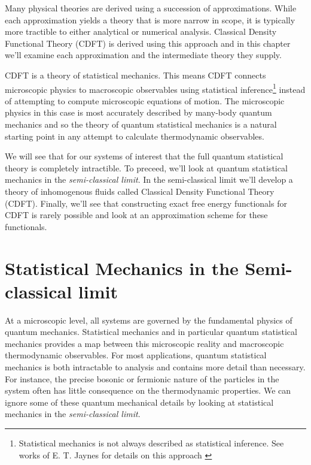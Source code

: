 \label{chapter:cdft_intro}

Many physical theories are derived using a succession of approximations. While
each approximation yields a theory that is more narrow in scope, it is
typically more tractible to either analytical or numerical analysis.  Classical
Density Functional Theory (CDFT) is derived using this approach and in this
chapter we'll examine each approximation and the intermediate theory they
supply. 

CDFT is a theory of statistical mechanics. This means CDFT connects microscopic
physics to macroscopic observables using statistical
inference\footnote{Statistical mechanics is not always described as statistical
inference. See works of E. T. Jaynes for details on this approach
\cite{JAYNES57}} instead of attempting to compute microscopic equations of
motion. The microscopic physics in this case is most accurately described by
many-body quantum mechanics and so the theory of quantum statistical mechanics
is a natural starting point in any attempt to calculate thermodynamic
observables.

We will see that for our systems of interest that the full quantum statistical
theory is completely intractible. To preceed, we'll look at quantum statistical
mechanics in the \textit{semi-classical limit}. In the semi-classical limit
we'll develop a theory of inhomogenous fluids called Classical Density
Functional Theory (CDFT). Finally, we'll see that constructing exact free
energy functionals for CDFT is rarely possible and look at an approximation
scheme for these functionals.

\section{Statistical Mechanics in the Semi-classical limit} %

At a microscopic level, all systems are governed by the fundamental physics of
quantum mechanics. Statistical mechanics and in particular quantum statistical
mechanics provides a map between this microscopic reality and macroscopic
thermodynamic observables. For most applications, quantum statistical mechanics
is both intractable to analysis and contains more detail than necessary. For
instance, the precise bosonic or fermionic nature of the particles in the
system often has little consequence on the thermodynamic properties.  We can
ignore some of these quantum mechanical details by looking at statistical
mechanics in the \textit{semi-classical limit}.

